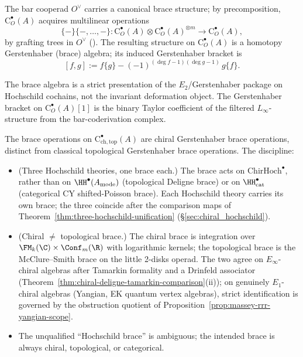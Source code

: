 \begin{definition}
\label{def:brace-ops-brace}
The bar cooperad $O^\vee$ carries a canonical brace structure; by precomposition,
$\mathrm{C}^\bullet_O(A)$ acquires multilinear operations
\[
\{-\}\{-,\ldots,-\}\colon \mathrm{C}^\bullet_O(A)\otimes \mathrm{C}^\bullet_O(A)^{\otimes m}\longrightarrow \mathrm{C}^\bullet_O(A),
\]
by grafting trees in $O^\vee$ (\cite{GJ94,Vor99}).
The resulting structure on $\mathrm{C}^\bullet_O(A)$ is a homotopy Gerstenhaber (brace) algebra; its induced Gerstenhaber bracket is
\[
[f,g] := f\{g\} - (-1)^{(\deg f-1)(\deg g-1)}\, g\{f\}.
\]
\end{definition}

\begin{remark}
\label{rem:brace-strict-coordinates}
The brace algebra is a strict presentation of the $E_2$/Gerstenhaber package on
Hochschild cochains, not the invariant deformation object. The Gerstenhaber bracket on
$\mathrm{C}^\bullet_O(A)[1]$ is the binary Taylor coefficient of the
filtered $L_\infty$-structure from the bar-coderivation complex.
\end{remark}

\begin{remark}%
\label{rem:brace-chiral-vs-topological-discipline}%
%
%
The brace operations on
$\mathrm{C}^\bullet_{\mathrm{ch,top}}(A)$ are
chiral Gerstenhaber brace operations, distinct from classical
topological Gerstenhaber brace operations. The discipline:
\begin{itemize}[nosep]
\item (Three Hochschild theories, one brace each.) The brace acts on
 $\mathrm{ChirHoch}^\bullet$, rather than on
 $\HH^\bullet(A_{\mathrm{mode}})$ (topological Deligne brace) or on
 $\HH^\bullet_{\mathrm{cat}}$ (categorical CY shifted-Poisson brace).
 Each Hochschild theory carries its own brace; the three coincide after the comparison maps of
 Theorem~\ref{thm:three-hochschild-unification} (\S\ref{sec:chiral_hochschild}).
\item (Chiral $\ne$ topological brace.) The chiral brace is
 integration over $\FM_k(\C) \times \Conf_m(\R)$
 with logarithmic kernels; the topological brace is the McClure--Smith
 brace on the little 2-disks operad. The two agree on
 $E_\infty$-chiral algebras after Tamarkin formality and a Drinfeld
 associator (Theorem~\ref{thm:chiral-deligne-tamarkin-comparison}(ii));
 on genuinely $E_1$-chiral algebras (Yangian, EK quantum
 vertex algebras), strict identification is governed by the
 obstruction quotient of Proposition~\ref{prop:massey-rrr-yangian-scope}.
\item The unqualified ``Hochschild brace'' is ambiguous;
 the intended brace is always chiral, topological, or categorical.
\end{itemize}
\end{remark}


